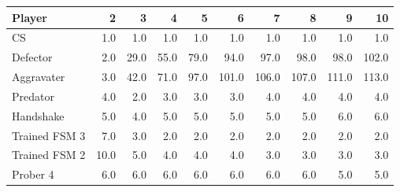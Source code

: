 \begin{tabular}{lrrrrrrrrr}
\toprule
        Player &     2 &     3 &     4 &     5 &      6 &      7 &      8 &      9 &     10 \\
\midrule
            CS &   1.0 &   1.0 &   1.0 &   1.0 &    1.0 &    1.0 &    1.0 &    1.0 &    1.0 \\
      Defector &   2.0 &  29.0 &  55.0 &  79.0 &   94.0 &   97.0 &   98.0 &   98.0 &  102.0 \\
    Aggravater &   3.0 &  42.0 &  71.0 &  97.0 &  101.0 &  106.0 &  107.0 &  111.0 &  113.0 \\
      Predator &   4.0 &   2.0 &   3.0 &   3.0 &    3.0 &    4.0 &    4.0 &    4.0 &    4.0 \\
     Handshake &   5.0 &   4.0 &   5.0 &   5.0 &    5.0 &    5.0 &    5.0 &    6.0 &    6.0 \\
 Trained FSM 3 &   7.0 &   3.0 &   2.0 &   2.0 &    2.0 &    2.0 &    2.0 &    2.0 &    2.0 \\
 Trained FSM 2 &  10.0 &   5.0 &   4.0 &   4.0 &    4.0 &    3.0 &    3.0 &    3.0 &    3.0 \\
      Prober 4 &   6.0 &   6.0 &   6.0 &   6.0 &    6.0 &    6.0 &    6.0 &    5.0 &    5.0 \\
\bottomrule
\end{tabular}
